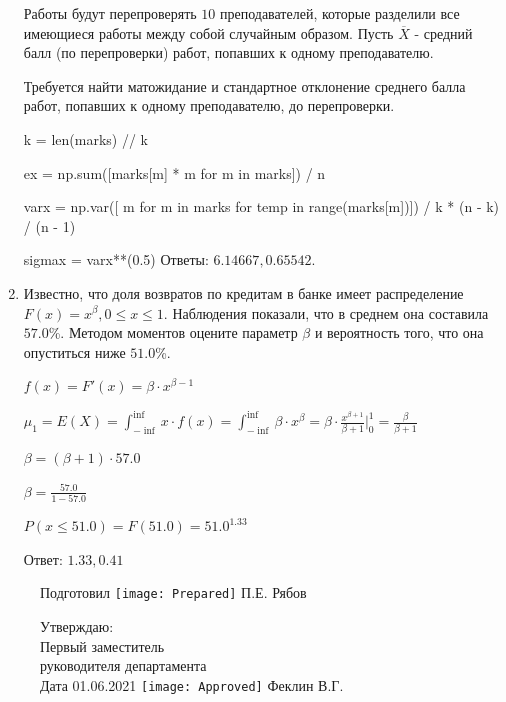 \documentclass[a4paper,14pt]{article}
\begin{document}
\begin{enumerate}
	Работы будут перепроверять $10$ преподавателей, которые разделили все имеющиеся работы между собой случайным образом. Пусть $\overline{X}$ - средний балл (по перепроверки) работ, попавших к одному преподавателю.

	Требуется найти матожидание и стандартное отклонение среднего балла работ, попавших к одному преподавателю, до перепроверки.
    


    


    k = len(marks) // k

    ex = np.sum([marks[m] * m for m in marks]) / n

    varx = np.var([ m for m in marks for temp in range(marks[m])]) / k * (n - k) / (n - 1)

    sigmax = varx**(0.5)
    Ответы: $6.14667, 0.65542$.

    

\item

    
	Известно, что доля возвратов по кредитам в банке имеет распределение $F(x) = x^{\beta}, 0 \le x \le 1$. Наблюдения показали, что в среднем она составила $57.0$\%. Методом моментов оцените параметр $\beta$ и вероятность того, что она опуститься ниже $51.0$\%.
	


	

	$f(x) = F'(x) = \beta \cdot x^{\beta - 1}$

	$\mu_{1} = E(X) = \int_{-\inf}^{\inf}x \cdot f(x) = \int_{-\inf}^{\inf} \beta \cdot x^{\beta} = \beta \cdot \frac{x^{\beta + 1}}{\beta + 1}\bigg|_0^1 = \frac{\beta}{\beta + 1}$

	$\beta = (\beta + 1) \cdot 57.0$

	$\beta = \frac{57.0}{1 - 57.0}$

	$ P(x \le 51.0) = F(51.0) = 51.0^{1.33} $

    Ответ: $1.33, 0.41$
	

\end{enumerate}

\begin{figure}[H]
	Подготовил
	\hfill
	\texttt{[image: Prepared]}
	П.Е. Рябов
\end{figure}


\begin{figure}[H]
	Утверждаю:\\
	Первый заместитель\\
	руководителя департамента\\
	Дата 01.06.2021
	\hfill
	\texttt{[image: Approved]}
	Феклин В.Г.
\end{figure}
\end{document}
